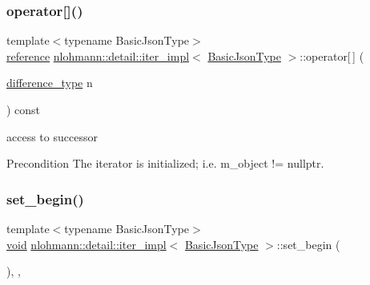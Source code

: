 \subsubsection{\texorpdfstring{operator[]()}{operator[]()}}
{\footnotesize\ttfamily template$<$typename Basic\+Json\+Type$>$ \\
\hyperlink{classnlohmann_1_1detail_1_1iter__impl_a5be8001be099c6b82310f4d387b953ce}{reference} \hyperlink{classnlohmann_1_1detail_1_1iter__impl}{nlohmann\+::detail\+::iter\+\_\+impl}$<$ \hyperlink{classnlohmann_1_1detail_1_1iter__impl_abf18f18793f84b0222aebb5a2a87da7a}{Basic\+Json\+Type} $>$\+::operator\mbox{[}$\,$\mbox{]} (\begin{DoxyParamCaption}\item[{\hyperlink{classnlohmann_1_1detail_1_1iter__impl_a2f7ea9f7022850809c60fc3263775840}{difference\+\_\+type}}]{n }\end{DoxyParamCaption}) const\hspace{0.3cm}{\ttfamily [inline]}}



access to successor 

\begin{DoxyPrecond}{Precondition}
The iterator is initialized; i.\+e. {\ttfamily m\+\_\+object != nullptr}. 
\end{DoxyPrecond}
\mbox{\label{classnlohmann_1_1detail_1_1iter__impl_a5d5f92c7f6848814bc82cf7e4e541820}} 
\subsubsection{\texorpdfstring{set\+\_\+begin()}{set\_begin()}}
{\footnotesize\ttfamily template$<$typename Basic\+Json\+Type$>$ \\
\hyperlink{namespacenlohmann_1_1detail_a59fca69799f6b9e366710cb9043aa77d}{void} \hyperlink{classnlohmann_1_1detail_1_1iter__impl}{nlohmann\+::detail\+::iter\+\_\+impl}$<$ \hyperlink{classnlohmann_1_1detail_1_1iter__impl_abf18f18793f84b0222aebb5a2a87da7a}{Basic\+Json\+Type} $>$\+::set\+\_\+begin (\begin{DoxyParamCaption}{ }\end{DoxyParamCaption})\hspace{0.3cm}{\ttfamily [inline]}, {\ttfamily [private]}, {\ttfamily [noexcept]}}




